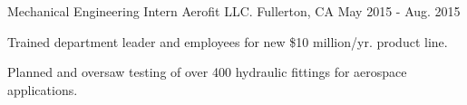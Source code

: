 \begin{cventries}
  \cventry
    {Mechanical Engineering Intern} %
    {Aerofit LLC.} %
    {Fullerton, CA} %
    {May 2015 - Aug. 2015} %
    {
      \begin{cvitems} %
        \item {Trained department leader and employees for new \$10 million/yr.
          product line.}
        \item {Planned and oversaw testing of over 400 hydraulic fittings for
          aerospace applications.}
      \end{cvitems}
    }

\end{cventries}
